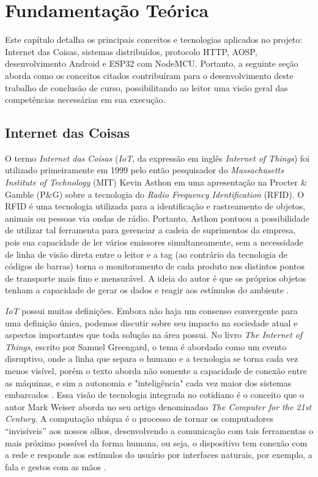 \chapter{Fundamentação Teórica}

Este capítulo detalha os principais conceitos e tecnologias aplicados no projeto: Internet das Coisas, sistemas distribuídos, protocolo HTTP, AOSP, desenvolvimento Android e ESP32 com NodeMCU. Portanto, 
a seguinte seção aborda como os conceitos citados contribuíram para o desenvolvimento deste trabalho de conclusão de curso, possibilitando
ao leitor uma visão geral das competências necessárias em sua execução. 

\section{Internet das Coisas}

O termo \textit{Internet das Coisas} (\textit{IoT}, da expressão em inglês \textit{Internet of Things}) foi utilizado primeiramente em 1999 pelo então pesquisador do \textit{Massachusetts Institute of Technology} (MIT) Kevin Asthon em uma apresentação na Procter \& Gamble (P\&G) sobre a tecnologia do \textit{Radio Frequency Identification} (RFID). O RFID é uma tecnologia utilizada para a identificação e rastreamento de objetos, animais ou pessoas via ondas de rádio. Portanto, Asthon pontuou a possibilidade de utilizar tal ferramenta para gerenciar a cadeia de suprimentos da empresa, pois sua capacidade de ler vários emissores simultaneamente, sem a necessidade de linha de visão direta entre o leitor e a tag (ao contrário da tecnologia de códigos de barras) torna o monitoramento de cada produto nos distintos pontos de transporte mais fino e mensurável. A ideia do autor 
é que os próprios objetos tenham a capacidade de gerar os dados e reagir aos estímulos do ambiente \cite{iot-first-definition}.

\textit{IoT} possui muitas definições. Embora não haja um consenso convergente para uma definição única, podemos discutir sobre seu impacto na sociedade atual e aspectos importantes que toda solução na área possui. No livro \textit{The Internet  of Things}, escrito por Samuel Greengard, o tema é abordado como um evento disruptivo, onde a linha que separa o humano e a tecnologia se torna cada vez menos visível, porém o texto aborda não somente a capacidade de conexão entre as máquinas, e sim a autonomia e "inteligência" cada vez maior dos sistemas embarcados \cite[pp. 17]{book-iot}. Essa visão de tecnologia integrada no cotidiano é o conceito que o autor Mark Weiser aborda no seu artigo denominadao \textit{The Computer for the 21st Century}. A computação ubíqua é o processo de tornar os computadores ``invisíveis'' aos nossos olhos, desenvolvendo a comunicação com tais ferramentas o mais próximo possível da forma humana, ou seja, o dispositivo tem conexão com a rede e responde aos estímulos do usuário por interfaces naturais, por exemplo, a fala e gestos com as mãos \cite{ubiquitous-computing}.

